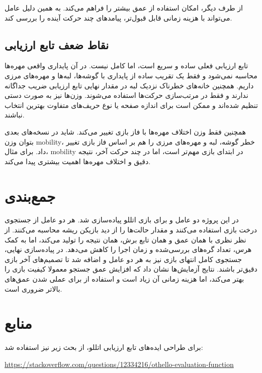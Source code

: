 \documentclass[10.5pt]{exam}
\begin{document}
از طرف دیگر،
امکان استفاده از عمق بیشتر را فراهم می‌کند. به همین دلیل عامل می‌تواند با هزینه زمانی قابل قبول‌تر، پیامدهای چند حرکت آینده را بررسی کند.

\subsection{نقاط ضعف تابع ارزیابی}
تابع ارزیابی فعلی ساده و سریع است، اما کامل نیست. در آن پایداری واقعی مهره‌ها محاسبه نمی‌شود و فقط یک تقریب ساده از پایداری با گوشه‌ها، لبه‌ها و مهره‌های مرزی داریم. همچنین خانه‌های خطرناک نزدیک لبه در مقدار نهایی تابع ارزیابی ضریب جداگانه ندارند و فقط در مرتب‌سازی حرکت‌ها استفاده می‌شوند. وزن‌ها نیز به صورت دستی تنظیم شده‌اند و ممکن است برای اندازه صفحه یا نوع حریف‌های متفاوت بهترین انتخاب نباشند.

همچنین فقط وزن اختلاف مهره‌ها با فاز بازی تغییر می‌کند. شاید در نسخه‌های بعدی بتوان وزن mobility، خطر گوشه، لبه و مهره‌های مرزی را هم بر اساس فاز بازی تغییر داد. برای مثال، mobility در ابتدای بازی مهم‌تر است، اما در چند حرکت آخر، نتیجه دقیق و اختلاف مهره‌ها اهمیت بیشتری پیدا می‌کند.

\section*{جمع‌بندی}
در این پروژه دو عامل
و
برای بازی اتللو پیاده‌سازی شد. هر دو عامل از جستجوی درخت بازی استفاده می‌کنند و مقدار حالت‌ها را از دید بازیکن ریشه محاسبه می‌کنند.
از نظر نظری با همان عمق و همان تابع برش، همان نتیجه
را تولید می‌کند، اما به کمک هرس، تعداد گره‌های بررسی‌شده و زمان اجرا را کاهش می‌دهد. در پیاده‌سازی نهایی، جستجوی کامل انتهای بازی نیز به هر دو عامل
و
اضافه شد تا تصمیم‌های آخر بازی دقیق‌تر باشند. نتایج آزمایش‌ها نشان داد که افزایش عمق جستجو معمولا کیفیت بازی را بهتر می‌کند، اما هزینه زمانی آن زیاد است و استفاده از
برای عملی شدن عمق‌های بالاتر ضروری است.

\section*{منابع}
برای طراحی ایده‌های تابع ارزیابی اتللو، از بحث زیر نیز استفاده شد:

\begin{latin}
\url{https://stackoverflow.com/questions/12334216/othello-evaluation-function}
\end{latin}
\end{document}
